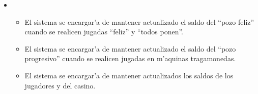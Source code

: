 \begin{itemize}
\item {}  

    \begin{itemize}
        \item El sistema se encargar'a de mantener actualizado el saldo del ``pozo feliz'' cuando se realicen jugadas ``feliz'' y ``todos ponen''.
        \item El sistema se encargar'a de mantener actualizado el saldo del ``pozo progresivo'' cuando se realicen jugadas en m'aquinas tragamonedas.
        \item El sistema se encargar'a de mantener actualizados los saldos de los jugadores y del casino.
    \end{itemize}

\end{itemize}




